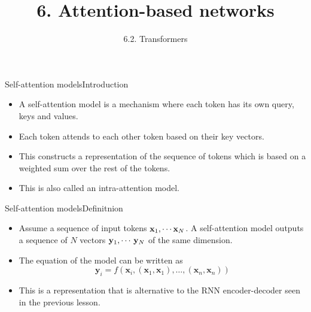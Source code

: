 \documentclass{beamer}
\title{6. Attention-based networks}
\subtitle{6.2. Transformers}
\begin{document}
\maketitle


\begin{frame}{Self-attention models}{Introduction}
\begin{itemize}
\item  A self-attention model is a mechanism where each token has its own query, keys and values.
\item Each token attends to each other token based on their key vectors. 
\item This constructs a representation of the sequence of tokens which is based on a weighted sum over the rest of the tokens.
\item This is also called an intra-attention model.

\end{itemize}
\end{frame}
\begin{frame}{Self-attention models}{Definitnion}
\begin{itemize}

\item Assume a sequence of input tokens ${\bf x}_1, \cdots {\bf x}_N$. A self-attention model outputs a sequence of $N$ vectors ${\bf y}_1, \cdots \, {\bf y}_N$ of the same dimension. 
    \item The equation of the model can be written as
\begin{equation}
    \mathbf{y}_i = f(\mathbf{x}_i, (\mathbf{x}_1, \mathbf{x}_1), \ldots, (\mathbf{x}_n, \mathbf{x}_n))
\end{equation}

\item This is a representation that is alternative to the RNN encoder-decoder seen in the previous lesson. 

\end{itemize}    
\end{frame}
\end{document}
